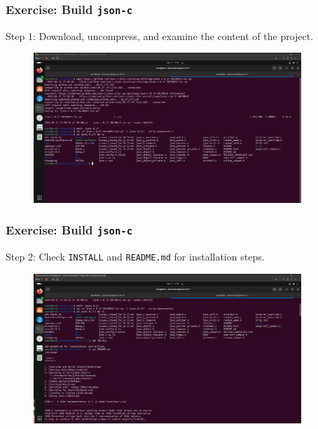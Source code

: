 \begin{frame}
    \frametitle{Exercise: Build \texttt{json-c}}

    Step 1: Download, uncompress, and examine the content of the project.

    \begin{figure}[H]
        \centering
        \includegraphics[width=0.9\textwidth]{../figure/jsonc_build_1.png}
    \end{figure}
\end{frame}

\begin{frame}
    \frametitle{Exercise: Build \texttt{json-c}}

    Step 2: Check \texttt{INSTALL} and \texttt{README.md} for installation steps.

    \begin{figure}[H]
        \centering
        \includegraphics[width=0.9\textwidth]{../figure/jsonc_build_2.png}
    \end{figure}
\end{frame}

